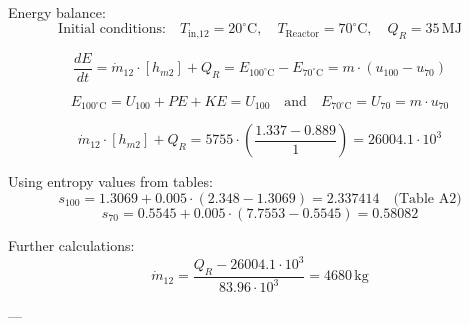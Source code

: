 Energy balance:  
\[
\text{Initial conditions:} \quad T_{\text{in,12}} = 20^\circ\text{C}, \quad T_{\text{Reactor}} = 70^\circ\text{C}, \quad Q_R = 35 \, \text{MJ}
\]

\[
\frac{dE}{dt} = \dot{m}_{12} \cdot [h_{m2}] + Q_R = E_{100^\circ\text{C}} - E_{70^\circ\text{C}} = m \cdot (u_{100} - u_{70})
\]

\[
E_{100^\circ\text{C}} = U_{100} + PE + KE = U_{100} \quad \text{and} \quad E_{70^\circ\text{C}} = U_{70} = m \cdot u_{70}
\]

\[
\dot{m}_{12} \cdot [h_{m2}] + Q_R = 5755 \cdot \left( \frac{1.337 - 0.889}{1} \right) = 26004.1 \cdot 10^3
\]

Using entropy values from tables:  
\[
s_{100} = 1.3069 + 0.005 \cdot (2.348 - 1.3069) = 2.337414 \quad \text{(Table A2)}
\]
\[
s_{70} = 0.5545 + 0.005 \cdot (7.7553 - 0.5545) = 0.58082
\]

Further calculations:  
\[
\dot{m}_{12} = \frac{Q_R - 26004.1 \cdot 10^3}{83.96 \cdot 10^3} = 4680 \, \text{kg}
\]

---